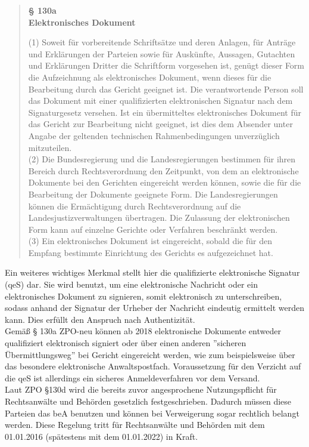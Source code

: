\begin{quote}
	\begin{center}
		\textbf{§ 130a} \\
		\textbf{Elektronisches Dokument}
	\end{center}
	(1) Soweit für vorbereitende Schriftsätze und deren Anlagen, für Anträge und Erklärungen der Parteien sowie für Auskünfte, Aussagen, Gutachten und Erklärungen Dritter die Schriftform vorgesehen ist, genügt dieser Form die Aufzeichnung als elektronisches Dokument, wenn dieses für die Bearbeitung durch das Gericht geeignet ist. Die verantwortende Person soll das Dokument mit einer qualifizierten elektronischen Signatur nach dem Signaturgesetz versehen. Ist ein übermitteltes elektronisches Dokument für das Gericht zur Bearbeitung nicht geeignet, ist dies dem Absender unter Angabe der geltenden technischen Rahmenbedingungen unverzüglich mitzuteilen. \\
	(2) Die Bundesregierung und die Landesregierungen bestimmen für ihren Bereich durch Rechtsverordnung den Zeitpunkt, von dem an elektronische Dokumente bei den Gerichten eingereicht werden können, sowie die für die Bearbeitung der Dokumente geeignete Form. Die Landesregierungen können die Ermächtigung durch Rechtsverordnung auf die Landesjustizverwaltungen übertragen. Die Zulassung der elektronischen Form kann auf einzelne Gerichte oder Verfahren beschränkt werden. \\
	(3) Ein elektronisches Dokument ist eingereicht, sobald die für den Empfang bestimmte Einrichtung des Gerichts es aufgezeichnet hat.
\end{quote}

Ein weiteres wichtiges Merkmal stellt hier die qualifizierte elektronische Signatur (qeS) dar. Sie wird benutzt, um eine elektronische Nachricht oder ein elektronisches Dokument zu signieren, somit elektronisch zu unterschreiben, sodass anhand der Signatur der Urheber der Nachricht eindeutig ermittelt werden kann. Dies erfüllt den Anspruch nach Authentizität. \\
Gemäß § 130a ZPO-neu \cite{bea:bea:zpo130} können ab 2018 elektronische Dokumente entweder qualifiziert elektronisch signiert oder über einen anderen ''sicheren Übermittlungsweg'' bei Gericht eingereicht werden, wie zum beispielsweise über das besondere elektronische Anwaltspostfach. Voraussetzung für den Verzicht auf die qeS ist allerdings ein sicheres Anmeldeverfahren vor dem Versand.
\\
Laut ZPO §130d \cite{bea:bea:zpo130} wird die bereits zuvor angesprochene Nutzungspflicht für Rechtsanwälte und Behörden gesetzlich festgeschrieben. Dadurch müssen diese Parteien das beA benutzen und können bei Verweigerung sogar rechtlich belangt werden. Diese Regelung tritt für Rechtsanwälte und Behörden mit dem 01.01.2016 (spätestens mit dem 01.01.2022) in Kraft.

